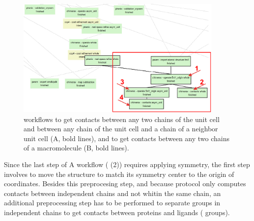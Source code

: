         \begin{figure}[H]
            \centering 
            \captionsetup{width=.9\linewidth} 
            \includegraphics[width=0.9\textwidth]{Images/Fig46}
            \caption{\scipion workflows to get contacts between any two chains of the unit cell and between any chain of the unit cell and a chain of a neighbor unit cell (A, bold lines), and to get contacts between any two chains of a macromolecule (B, bold lines).}
            \label{fig:workflows_contacts}
        \end{figure}
        
Since the last step of A workflow ( (2)) requires applying symmetry, the first step involves to move the structure to match its symmetry center to the origin of coordinates. Besides this preprocesing step, and because protocol  only computes contacts between independent chains and not whitin the same chain, an additional preprocessing step has to be performed to separate  groups in independent chains to get contacts between proteins and ligands ( groups).

